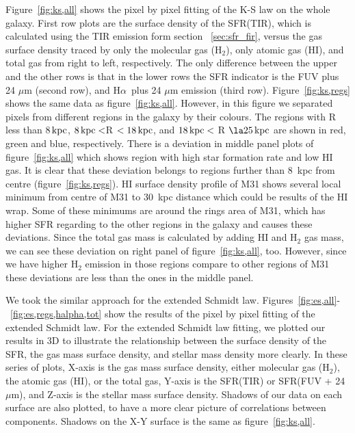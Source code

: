 \documentclass[useAMS,usenatbib]{mn2e}
\newcommand \kpc        {\,{\rm kpc}}
\newcommand \halpha    {H$\alpha $\ }
\begin{document}
Figure~\ref{fig:ks,all} shows the pixel by pixel fitting of the K-S law on the whole galaxy. First row plots are the surface density of the SFR(TIR), which is calculated using  the TIR emission form section ~\ref{sec:sfr_fir}, versus the gas surface density traced by only the molecular gas (H$_2$),  only atomic gas (HI), and total gas from right to left, respectively. The only difference between the upper and the other rows is that in the lower rows the SFR indicator is the FUV plus 24 $\mu$m (second row), and \halpha plus 24 $\mu$m emission (third row). Figure~\ref{fig:ks,regs} shows the same data as figure~\ref{fig:ks,all}. However, in this figure we separated pixels from different regions in the galaxy by their colours. The regions with R less than 8$\kpc$, $8\kpc < $R $< 18\kpc$, and $18\kpc <$ R $\la 25\kpc$ are shown in red, green and blue, respectively. There is a deviation in middle panel plots of figure~\ref{fig:ks,all} which shows region with high star formation rate and low HI gas. It is clear that these deviation belongs to regions further than 8~kpc from centre (figure~\ref{fig:ks,regs}). HI surface density profile of M31 \citep[See figure 16 in.][]{Chemin09} shows several local minimum from centre of M31 to 30~kpc distance which could be results of the HI wrap. Some of these minimums are around the rings area of M31, which has higher SFR regarding to the other regions in the galaxy and causes these deviations. Since the total gas mass is calculated by adding HI and H$_2$ gas mass, we can see these deviation on right panel of figure~\ref{fig:ks,all}, too. However, since we have higher H$_2$ emission in those regions compare to other regions of M31 these deviations are less than the ones in the middle panel.  

We took the similar approach for the extended Schmidt law. Figures~\ref{fig:es,all}-~\ref{fig:es,regs,halpha,tot} show the results of the pixel by pixel fitting of the extended Schmidt law. For the extended Schmidt law fitting, we plotted our results in 3D to illustrate the relationship between the surface density of the SFR, the gas mass surface density, and stellar mass density more clearly. In these series of plots, X-axis is the gas mass surface density, either molecular gas (H$_2$), the atomic gas (HI), or the total gas, Y-axis is the SFR(TIR) or SFR(FUV + 24 $\mu$m), and Z-axis is the stellar mass surface density. Shadows of our data on each surface are also plotted, to have a more clear picture of correlations between components. Shadows on the X-Y surface is the same as figure~\ref{fig:ks,all}. 
\end{document}
